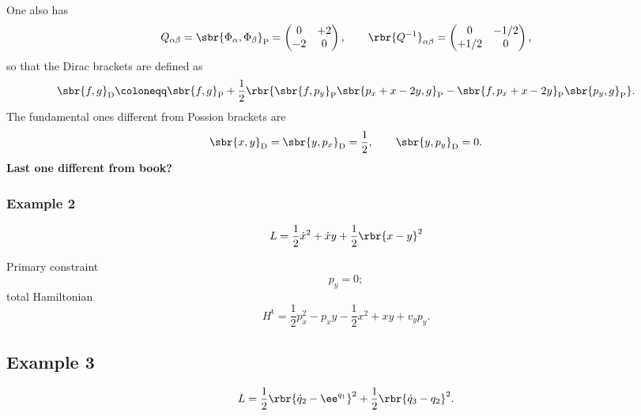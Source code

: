 \documentclass[a4paper,11pt]{article}
\begin{document}
One also has
\begin{equation}
Q_{\alpha\beta} = \sbr{\Phi_\alpha, \Phi_\beta}_\text{P} =
\begin{pmatrix} 0 & +2 \\ -2 & 0 \end{pmatrix},\qquad
\rbr{Q^{-1}}_{\alpha\beta} =
\begin{pmatrix} 0 & -1/2 \\ +1/2 & 0 \end{pmatrix},
\end{equation}
so that the Dirac brackets are defined as
\begin{equation}
\sbr{f,g}_\text{D} \coloneqq \sbr{f,g}_\text{P} + \frac{1}{2}
\rbr{\sbr{f,p_y}_\text{P}\sbr{p_x+x-2y,g}_\text{P}
-\sbr{f,p_x+x-2y}_\text{P}\sbr{p_y,g}_\text{P}}.
\end{equation}
The fundamental ones different from Possion brackets are
\begin{equation}
\sbr{x,y}_\text{D} = \sbr{y,p_x}_\text{D} = \frac{1}{2},\qquad
\sbr{y,p_y}_\text{D} = 0.
\end{equation}
\textbf{Last one different from book?}







\subsubsection*{Example 2}

\begin{equation}
L = \frac{1}{2}\dot{x}^2 + \dot{x} y + \frac{1}{2}\rbr{x-y}^2
\end{equation}

Primary constraint
\begin{equation}
p_y = 0;
\end{equation}
total Hamiltonian
\begin{equation}
H^\text{t} = \frac{1}{2}p_x^2 - p_x y - \frac{1}{2} x^2 + xy + v_y p_y.
\end{equation}

\subsection*{Example 3}

\begin{equation}
L = \frac{1}{2} \rbr{\dot{q}_2 - \ee^{q_1}}^2 + \frac{1}{2} \rbr{\dot{q}_3 - 
q_2}^2.
\end{equation}
\end{document}
